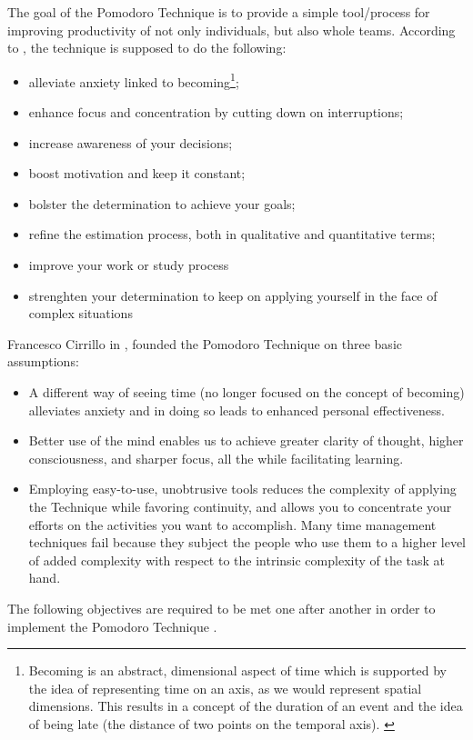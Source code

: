 \documentclass[11pt,singleside]{myfithesis2}
\begin{document}
The goal of the Pomodoro Technique is to provide a simple tool/process for improving productivity of not only individuals, but also whole teams. According to \cite{pomodoro}, the technique is supposed to do the following:
\begin{itemize}
	\item alleviate anxiety linked to becoming\footnote{Becoming is an abstract, dimensional aspect of time which is supported by the idea of representing time on an axis,  as we would represent spatial dimensions. This results in a concept of the duration of an event and the idea of being late (the distance of two points on the temporal axis). \cite{pomodoro}};
	\item enhance focus and concentration by cutting down on interruptions;
	\item increase awareness of your decisions;
	\item boost motivation and keep it constant;
	\item bolster the determination to achieve your goals;
	\item refine the estimation process, both in qualitative and quantitative terms;
	\item improve your work or study process
	\item strenghten your determination to keep on applying yourself in the face of complex situations
\end{itemize}

Francesco Cirrillo in \cite{pomodoro}, founded the Pomodoro Technique on three basic assumptions:
\begin{itemize}
	\item A different way of seeing time (no longer focused on the concept of becoming) alleviates anxiety and in doing so leads to enhanced personal effectiveness. 
	\item Better use of the mind enables us to achieve greater clarity of thought, higher consciousness, and sharper focus, all the while facilitating learning. 
	\item Employing easy-to-use, unobtrusive tools reduces the complexity of applying the Technique while favoring continuity, and allows you to concentrate your efforts on the 	activities you want to accomplish. Many time management techniques fail because they subject the people who use them to a higher level of added complexity with respect to the intrinsic complexity of the task at hand.
\end{itemize}

The following objectives are required to be met one after another in order to implement the Pomodoro Technique \cite{pomodoro}.
\end{document}
